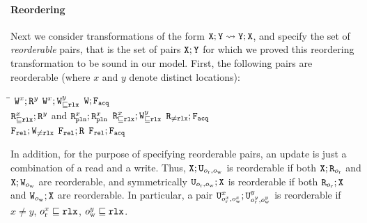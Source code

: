 \paragraph{Reordering}
Next we consider transformations of the form  $\texttt{X} ; \texttt{Y} \leadsto \texttt{Y};\texttt{X}$,
and specify the set of \emph{reorderable} pairs, that is
the set of pairs $\texttt{X};\texttt{Y}$ for which we proved this reordering transformation to be sound in our model. 
First, the following pairs  are reorderable (where $x$ and $y$ denote distinct locations):
{\begin{tabbing}
\hspace{5cm}\= \hspace{3cm}\=\kill
\sbul $\texttt{W}^x;\texttt{R}^y$ \> 
\sbul  $\texttt{W}^x;\texttt{W}^y_{\sqsubseteq \texttt{rlx}}$  \>
\sbul$\texttt{W};\texttt{F}_{\texttt{acq}}$ \\[1mm]
\sbul $\texttt{R}^x_{\sqsubseteq \texttt{rlx}};\texttt{R}^y$ and $\texttt{R}^x_{\texttt{pln}};\texttt{R}^x_{\texttt{pln}}$ \>
\sbul $\texttt{R}^x_{\sqsubseteq \texttt{rlx}};\texttt{W}^y_{\sqsubseteq \texttt{rlx}}$ \>
\sbul $\texttt{R}_{\neq \texttt{rlx}};\texttt{F}_{\texttt{acq}}$ \\[1mm]
\sbul  $\texttt{F}_{\texttt{rel}};\texttt{W}_{\neq\texttt{rlx}}$   \> \sbul $\texttt{F}_{\texttt{rel}};\texttt{R}$  \> \sbul $\texttt{F}_{\texttt{rel}};\texttt{F}_{\texttt{acq}}$
\end{tabbing} }


In addition, for the purpose of specifying reorderable pairs, an update is just a combination of a read and a write.
Thus, $\texttt{X};\texttt{U}_{o_{\text{r}},o_{\text{w}}}$ is reorderable if both $\texttt{X};\texttt{R}_{o_{\text{r}}}$ and $\texttt{X};\texttt{W}_{o_{\text{w}}}$ are reorderable,
and symmetrically  $\texttt{U}_{o_{\text{r}},o_{\text{w}}};\texttt{X}$ is reorderable if both $\texttt{R}_{o_{\text{r}}};\texttt{X}$ and $\texttt{W}_{o_{\text{w}}};\texttt{X}$ are reorderable.
In particular, a pair $\texttt{U}^x_{o^x_{\text{r}},o^x_{\text{w}}}; \texttt{U}^y_{o^y_{\text{r}},o^y_{\text{w}}}$
is reorderable if $x\neq y$, $o_{\text{r}}^x \sqsubseteq \texttt{rlx}$, $o_{\text{w}}^y \sqsubseteq \texttt{rlx}$.


